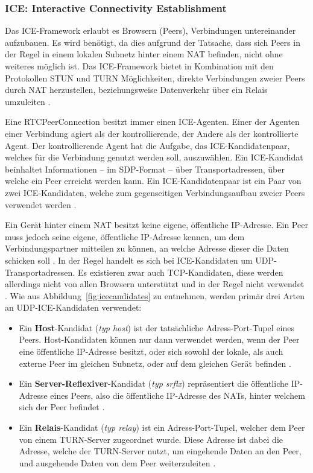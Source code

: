 \subsubsection{ICE: Interactive Connectivity Establishment}
Das \acf{ICE}-Framework erlaubt es Browsern (Peers), Verbindungen untereinander aufzubauen. Es wird benötigt, da dies aufgrund der Tatsache, dass sich Peers in der Regel in einem lokalen Subnetz hinter einem \acs{NAT} befinden, nicht ohne weiteres möglich ist. Das \acs{ICE}-Framework bietet in Kombination mit den Protokollen \acs{STUN} und \acs{TURN} Möglichkeiten, direkte Verbindungen zweier Peers durch \acs{NAT} herzustellen, beziehungsweise Datenverkehr über ein Relais umzuleiten \cite{rtcprotocols}.\par

Eine RTCPeerConnection besitzt immer einen \acs{ICE}-Agenten. Einer der Agenten einer Verbindung agiert als der kontrollierende, der Andere als der kontrollierte Agent. Der kontrollierende Agent hat die Aufgabe, das \acs{ICE}-Kandidatenpaar, welches für die Verbindung genutzt werden soll, auszuwählen. Ein \acs{ICE}-Kandidat beinhaltet Informationen -- im \acs{SDP}-Format -- über Transportadressen, über welche ein Peer erreicht werden kann. Ein \acs{ICE}-Kandidatenpaar ist ein Paar von zwei \acs{ICE}-Kandidaten, welche zum gegenseitigen Verbindungsaufbau zweier Peers verwendet werden \cite{rtcconnectivity}.

Ein Gerät hinter einem \acs{NAT} besitzt keine eigene, öffentliche \acs{IP}-Adresse. Ein Peer muss jedoch seine eigene, öffentliche \acs{IP}-Adresse kennen, um dem Verbindungspartner mitteilen zu können, an welche Adresse dieser die Daten schicken soll \cite{rtcconnectivity}. In der Regel handelt es sich bei \acs{ICE}-Kandidaten um \acs{UDP}-Transportadressen. Es existieren zwar auch \acs{TCP}-Kandidaten, diese werden allerdings nicht von allen Browsern unterstützt und in der Regel nicht verwendet \cite{rtcconnectivity}. Wie aus Abbildung~\ref{fig:icecandidates} zu entnehmen, werden primär drei Arten an \acs{UDP}-\acs{ICE}-Kandidaten verwendet:

\begin{itemize}
	\item Ein \textbf{Host}-Kandidat (\textit{typ host}) ist der tatsächliche Adress-Port-Tupel eines Peers. Host-Kandidaten können nur dann verwendet werden, wenn der Peer eine öffentliche \acs{IP}-Adresse besitzt, oder sich sowohl der lokale, als auch externe Peer im gleichen Subnetz, oder auf dem gleichen Gerät befinden \cite{rtcconnectivity}.
	\item Ein \textbf{Server-Reflexiver}-Kandidat (\textit{typ srflx}) repräsentiert die öffentliche \acs{IP}-Adresse eines Peers, also die öffentliche \acs{IP}-Adresse des \acs{NAT}s, hinter welchem sich der Peer befindet \cite{rtcconnectivity}.
	\newpage
	\item Ein \textbf{Relais}-Kandidat (\textit{typ relay}) ist ein Adress-Port-Tupel, welcher dem Peer von einem \acs{TURN}-Server zugeordnet wurde. Diese Adresse ist dabei die Adresse, welche der \acs{TURN}-Server nutzt, um eingehende Daten an den Peer, und ausgehende Daten von dem Peer weiterzuleiten \cite{rtcconnectivity}.
\end{itemize}

